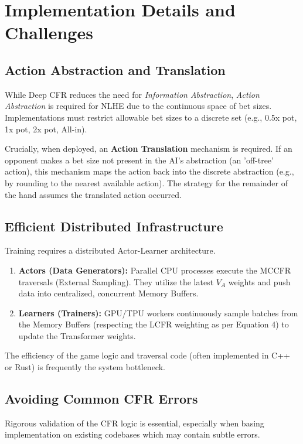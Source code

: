 \documentclass[11pt,a4paper]{article}
\begin{document}
\section{Implementation Details and Challenges}

\subsection{Action Abstraction and Translation}

While Deep CFR reduces the need for \textit{Information Abstraction}, \textit{Action Abstraction} is required for NLHE due to the continuous space of bet sizes. Implementations must restrict allowable bet sizes to a discrete set (e.g., 0.5x pot, 1x pot, 2x pot, All-in).

Crucially, when deployed, an \textbf{Action Translation} mechanism is required. If an opponent makes a bet size not present in the AI's abstraction (an 'off-tree' action), this mechanism maps the action back into the discrete abstraction (e.g., by rounding to the nearest available action). The strategy for the remainder of the hand assumes the translated action occurred.

\subsection{Efficient Distributed Infrastructure}

Training requires a distributed Actor-Learner architecture.
\begin{enumerate}
    \item \textbf{Actors (Data Generators):} Parallel CPU processes execute the MCCFR traversals (External Sampling). They utilize the latest $V_A$ weights and push data into centralized, concurrent Memory Buffers.
    \item \textbf{Learners (Trainers):} GPU/TPU workers continuously sample batches from the Memory Buffers (respecting the LCFR weighting as per Equation 4) to update the Transformer weights.
\end{enumerate}
The efficiency of the game logic and traversal code (often implemented in C++ or Rust) is frequently the system bottleneck.

\subsection{Avoiding Common CFR Errors}

Rigorous validation of the CFR logic is essential, especially when basing implementation on existing codebases which may contain subtle errors.
\end{document}
